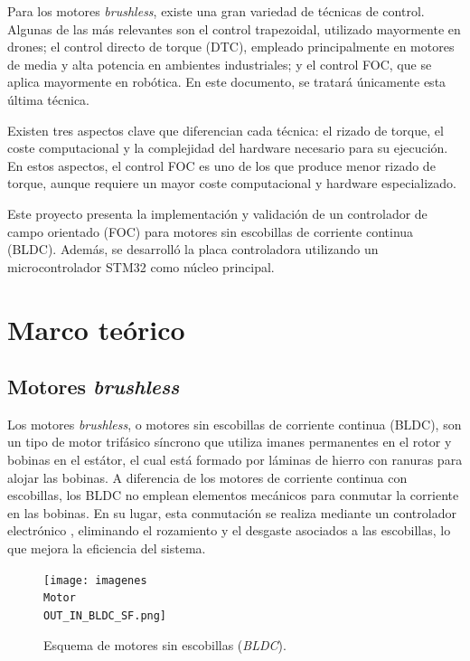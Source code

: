 \documentclass[11pt]{report}
\begin{document}
Para los motores \textit{brushless}, existe una gran variedad de técnicas de control. Algunas de las más relevantes son el control trapezoidal, utilizado mayormente en drones; el control directo de torque (DTC), empleado principalmente en motores de media y alta potencia en ambientes industriales; y el control FOC, que se aplica mayormente en robótica. En este documento, se tratará únicamente esta última técnica.

Existen tres aspectos clave que diferencian cada técnica: el rizado de torque, el coste computacional y la complejidad del hardware necesario para su ejecución. En estos aspectos, el control FOC es uno de los que produce menor rizado de torque, aunque requiere un mayor coste computacional y hardware especializado.

Este proyecto presenta la implementación y validación de un controlador de campo orientado (FOC) para motores sin escobillas de corriente continua (BLDC). Además, se desarrolló la placa controladora utilizando un microcontrolador STM32 como núcleo principal.

\newpage
\section{Marco teórico}
\subsection{Motores \textit{brushless}}
Los motores \textit{brushless}, o motores sin escobillas de corriente continua (BLDC), son un tipo de motor trifásico síncrono que utiliza imanes permanentes en el rotor y bobinas en el estátor, el cual está formado por láminas de hierro con ranuras para alojar las bobinas. A diferencia de los motores de corriente continua con escobillas, los BLDC no emplean elementos mecánicos para conmutar la corriente en las bobinas. En su lugar, esta conmutación se realiza mediante un controlador electrónico \cite{frick2018bldc}, eliminando el rozamiento y el desgaste asociados a las escobillas, lo que mejora la eficiencia del sistema.

\begin{figure}[ht]
	\centering
	\texttt{[image: imagenes\\Motor\\OUT\_IN\_BLDC\_SF.png]}
	\caption{Esquema de motores sin escobillas (\textit{BLDC}).}
	\label{fig:motor_sin_escobillas}
\end{figure}
\FloatBarrier
\end{document}
